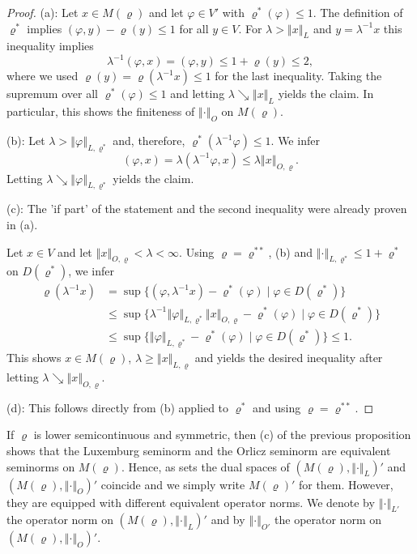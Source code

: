 \documentclass[a4paper,11pt,reqno]{amsart}
\theoremstyle{definition}
\numberwithin{equation}{section}
\newcommand{\vr}{{\varrho}}
\newcommand{\av}[1]{\left\Vert #1\right\Vert}
\newcommand{\1}{\mathds{1}}
\begin{document}
 \begin{proof}
 (a):  Let $x \in M(\vr)$ and let $\varphi \in V'$ with $\vr^*(\varphi) \leq 1$. The definition of $\vr^*$ implies $(\varphi,y) - \vr(y) \leq 1$ for all $y \in V$. For $\lambda > \av{x}_L$ and $y = \lambda^{-1}x$ this inequality implies
  $$\lambda^{-1} (\varphi,x) = (\varphi,y) \leq 1 + \vr(y) \leq 2,$$
  where we used $\vr(y) = \vr(\lambda^{-1}x) \leq 1$ for the last inequality. Taking the supremum over all $\vr^*(\varphi) \leq 1$ and letting $\lambda \searrow \av{x}_L$ yields the claim. In particular, this shows the finiteness of $\av{\cdot}_O$ on $M(\vr)$. 
 
 (b):  Let $\lambda > \av{\varphi}_{L,\vr^*}$ and, therefore, $\vr^*(\lambda^{-1} \varphi) \leq 1$. We infer 
 $$(\varphi,x) = \lambda (\lambda^{-1}\varphi,x) \leq \lambda \av{x}_{O,\vr}.$$
 Letting $\lambda \searrow \av{\varphi}_{L,\vr^*}$ yields the claim. 
 
 
 
 (c): The 'if part' of the statement and the second inequality were already proven in (a). 
 
 Let $x\in V$ and let $ \av{x}_{O,\vr} < \lambda < \infty$. Using $\vr = \vr^{**}$, (b) and $\av{\cdot}_{L,\vr^*} \leq 1 + \vr^*$ on $D(\vr^*)$, we infer
  \begin{align*}
   \vr(\lambda^{-1} x) &= \sup \{(\varphi,\lambda^{-1} x) - \vr^*(\varphi) \mid \varphi \in D(\vr^*)\}\\
   &\leq \sup \{\lambda^{-1} \av{\varphi}_{L,\vr^*} \av{x}_{O,\vr} - \vr^*(\varphi) \mid \varphi \in D(\vr^*)\} \\
   &\leq \sup \{ \av{\varphi}_{L,\vr^*}   - \vr^*(\varphi) \mid \varphi \in D(\vr^*)\}  \leq 1.
  \end{align*}
  This shows $x \in M(\vr)$, $\lambda \geq \av{x}_{L,\vr}$ and yields the desired inequality after letting $\lambda \searrow \av{x}_{O,\vr}$.
  
  
  (d):  This follows directly from (b) applied to $\vr^*$ and using $\vr = \vr^{**}$.
 \end{proof}

 

  If $\vr$ is lower semicontinuous and symmetric, then (c) of the previous proposition shows that the Luxemburg seminorm and the Orlicz seminorm are equivalent seminorms on $M(\vr)$. Hence, as sets the dual spaces  of $(M(\vr),\av{\cdot}_L)'$ and $(M(\vr),\av{\cdot}_O)'$ coincide and we simply write $M(\vr)'$ for them. However, they are equipped with different equivalent operator norms. We denote by $\av{\cdot}_{L'}$ the operator norm on $(M(\vr),\av{\cdot}_L)'$ and by $\av{\cdot}_{O'}$ the operator norm on $(M(\vr),\av{\cdot}_O)'$. 
  
\end{document}
